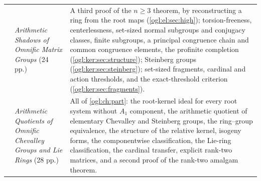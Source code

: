 \documentclass[11pt,oneside]{article}
\numberwithin{equation}{section}
\theoremstyle{definition}
\theoremstyle{remark}
\begin{document}
\begin{center}
\begin{tabular}{>{\raggedright\arraybackslash}p{}>{\raggedright\arraybackslash}p{}>{\raggedright\arraybackslash}p{}}
11 & \emph{Arithmetic Shadows of Omnific Matrix Groups} (24 pp.) &
A third proof of the $n\ge3$ theorem, by reconstructing a ring from the root
maps (\cref{ogl:el:sec:high}); torsion-freeness, centerlessness, set-sized
normal subgroups and conjugacy classes, finite subgroups, a principal
congruence chain and common congruence elements, the profinite completion
(\cref{ogl:ker:sec:structure}); Steinberg groups (\cref{ogl:ker:sec:steinberg});
set-sized fragments, cardinal and action thresholds, and the exact-threshold
criterion (\cref{ogl:ker:sec:fragments}).\\
12 & \emph{Arithmetic Quotients of Omnific Chevalley Groups and Lie Rings} (28 pp.) &
All of \cref{ogl:ch:part}: the root-kernel ideal for every root system without
$A_1$ component, the arithmetic quotient of elementary Chevalley and Steinberg
groups, the ring--group equivalence, the structure of the relative kernel,
isogeny forms, the componentwise classification, the Lie-ring
classification, the cardinal transfer, explicit rank-two matrices, and a second
proof of the rank-two amalgam theorem.\\
\bottomrule
\end{tabular}
\end{center}
\end{document}
